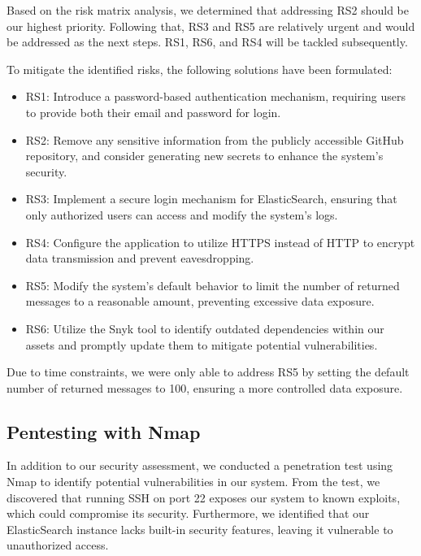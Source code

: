Based on the risk matrix analysis, we determined that addressing RS2 should be our highest priority. Following that, RS3 and RS5 are relatively urgent and would be addressed as the next steps. RS1, RS6, and RS4 will be tackled subsequently.

To mitigate the identified risks, the following solutions have been formulated:

\begin{itemize}
\item RS1: Introduce a password-based authentication mechanism, requiring users to provide both their email and password for login.
\item RS2: Remove any sensitive information from the publicly accessible GitHub repository, and consider generating new secrets to enhance the system's security.

\item RS3: Implement a secure login mechanism for ElasticSearch, ensuring that only authorized users can access and modify the system's logs.

\item RS4: Configure the application to utilize HTTPS instead of HTTP to encrypt data transmission and prevent eavesdropping.

\item RS5: Modify the system's default behavior to limit the number of returned messages to a reasonable amount, preventing excessive data exposure.

\item RS6: Utilize the Snyk tool to identify outdated dependencies within our assets and promptly update them to mitigate potential vulnerabilities.

\end{itemize}

Due to time constraints, we were only able to address RS5 by setting the default number of returned messages to 100, ensuring a more controlled data exposure.

\subsection{Pentesting with Nmap}

In addition to our security assessment, we conducted a penetration test using Nmap to identify potential vulnerabilities in our system. From the test, we discovered that running SSH on port 22 exposes our system to known exploits, which could compromise its security. Furthermore, we identified that our ElasticSearch instance lacks built-in security features, leaving it vulnerable to unauthorized access.

